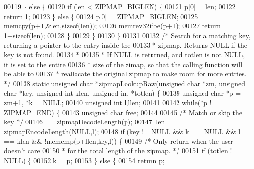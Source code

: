 \begin{DoxyCode}
00119     \} \textcolor{keywordflow}{else} \{
00120         \textcolor{keywordflow}{if} (len < \hyperlink{zipmap_8c_a1173592dbfaa84c6b2419d0a699c97f5}{ZIPMAP\_BIGLEN}) \{
00121             p[0] = len;
00122             \textcolor{keywordflow}{return} 1;
00123         \} \textcolor{keywordflow}{else} \{
00124             p[0] = \hyperlink{zipmap_8c_a1173592dbfaa84c6b2419d0a699c97f5}{ZIPMAP\_BIGLEN};
00125             memcpy(p+1,&len,\textcolor{keyword}{sizeof}(len));
00126             \hyperlink{endianconv_8h_a771f3656eb7d11a1e7f7294b657d8978}{memrev32ifbe}(p+1);
00127             \textcolor{keywordflow}{return} 1+\textcolor{keyword}{sizeof}(len);
00128         \}
00129     \}
00130 \}
00131 
00132 \textcolor{comment}{/* Search for a matching key, returning a pointer to the entry inside the}
00133 \textcolor{comment}{ * zipmap. Returns NULL if the key is not found.}
00134 \textcolor{comment}{ *}
00135 \textcolor{comment}{ * If NULL is returned, and totlen is not NULL, it is set to the entire}
00136 \textcolor{comment}{ * size of the zimap, so that the calling function will be able to}
00137 \textcolor{comment}{ * reallocate the original zipmap to make room for more entries. */}
00138 \textcolor{keyword}{static} \textcolor{keywordtype}{unsigned} \textcolor{keywordtype}{char} *zipmapLookupRaw(\textcolor{keywordtype}{unsigned} \textcolor{keywordtype}{char} *zm, \textcolor{keywordtype}{unsigned} \textcolor{keywordtype}{char} *key, \textcolor{keywordtype}{unsigned} \textcolor{keywordtype}{int} klen, \textcolor{keywordtype}{
      unsigned} \textcolor{keywordtype}{int} *totlen) \{
00139     \textcolor{keywordtype}{unsigned} \textcolor{keywordtype}{char} *p = zm+1, *k = NULL;
00140     \textcolor{keywordtype}{unsigned} \textcolor{keywordtype}{int} l,llen;
00141 
00142     \textcolor{keywordflow}{while}(*p != \hyperlink{zipmap_8c_a7074100d2ecc0c8971936a4edc208782}{ZIPMAP\_END}) \{
00143         \textcolor{keywordtype}{unsigned} \textcolor{keywordtype}{char} free;
00144 
00145         \textcolor{comment}{/* Match or skip the key */}
00146         l = zipmapDecodeLength(p);
00147         llen = zipmapEncodeLength(NULL,l);
00148         \textcolor{keywordflow}{if} (key != NULL && k == NULL && l == klen && !memcmp(p+llen,key,l)) \{
00149             \textcolor{comment}{/* Only return when the user doesn't care}
00150 \textcolor{comment}{             * for the total length of the zipmap. */}
00151             \textcolor{keywordflow}{if} (totlen != NULL) \{
00152                 k = p;
00153             \} \textcolor{keywordflow}{else} \{
00154                 \textcolor{keywordflow}{return} p;

\end{DoxyCode}
